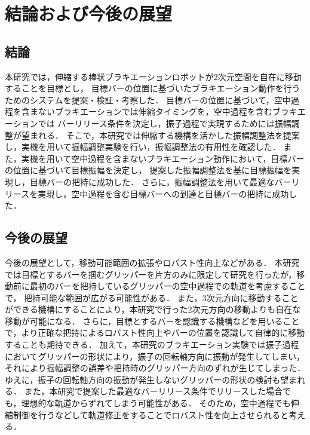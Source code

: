 \chapter[結論および今後の展望]%
{結論および今後の展望}
        \section{結論}

        本研究では，伸縮する棒状ブラキエーションロボットが2次元空間を自在に移動することを目標とし，
        目標バーの位置に基づいたブラキエーション動作を行うためのシステムを提案・検証・考察した．
        目標バーの位置に基づいて，空中過程を含まないブラキエーションでは伸縮タイミングを，空中過程を含むブラキエーションでは
        バーリリース条件を決定し，振子過程で実現するためには振幅調整が望まれる．
        そこで，本研究では伸縮する機構を活かした振幅調整法を提案し，実機を用いて振幅調整実験を行い，振幅調整法の有用性を確認した．
        また，実機を用いて空中過程を含まないブラキエーション動作において，目標バーの位置に基づいて目標振幅を決定し，
        提案した振幅調整法を基に目標振幅を実現し，目標バーの把持に成功した．
        さらに，振幅調整法を用いて最適なバーリリースを実現し，空中過程を含む目標バーへの到達と目標バーの把持に成功した．
       

          

        \section{今後の展望}
        
        今後の展望として，移動可能範囲の拡張やロバスト性向上などがある．
        本研究では目標とするバーを掴むグリッパーを片方のみに限定して研究を行ったが，移動前に最初のバーを把持しているグリッパーの空中過程での軌道を考慮することで，
        把持可能な範囲が広がる可能性がある．
        また，3次元方向に移動することができる機構にすることにより，本研究で行った2次元方向の移動よりも自在な移動が可能になる．
        さらに，目標とするバーを認識する機構などを用いることで，より正確な把持によるロバスト性向上やバーの位置を認識して自律的に移動することも期待できる．
        加えて，本研究のブラキエーション実験では振子過程においてグリッパーの形状により，振子の回転軸方向に振動が発生してしまい，
        それにより振幅調整の誤差や把持時のグリッパー方向のずれが生じてしまった．
        ゆえに，振子の回転軸方向の振動が発生しないグリッパーの形状の検討も望まれる．
        また，本研究で提案した最適なバーリリース条件でリリースした場合でも，理想的な軌道からずれてしまう可能性がある．
        そのため，空中過程でも伸縮制御を行うなどして軌道修正をすることでロバスト性を向上させられると考える．
